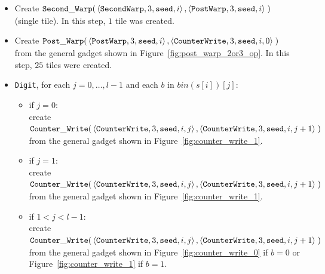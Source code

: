 \begin{itemize}
    \item Create
    $\begin{aligned}[t]
        {\tt Second\_Warp}(&\left\langle {\tt SecondWarp}, 3, {\tt seed}, i  \right\rangle,
                     \left\langle {\tt PostWarp},   3, {\tt seed}, i  \right\rangle \;)
    \end{aligned}$ (single tile).
    In this step, $1$ tile was created.

    \item Create
    $\begin{aligned}[t]
        {\tt Post\_Warp}(&\left\langle {\tt PostWarp}, 3, {\tt seed}, i    \right\rangle,
                   \left\langle {\tt CounterWrite},    3, {\tt seed}, i, 0 \right\rangle \;)
    \end{aligned}$\\from the general gadget shown in Figure~\ref{fig:post_warp_2or3_op}.
    In this step, $25$ tiles were created.

    \item {\tt Digit}, for each $j=0,\ldots,l-1$ and each $b$ in $bin(s[i])[j]$:
    \begin{itemize}
        \item if $j = 0$:\\ create
        $\begin{aligned}[t]
            {\tt Counter\_Write}(&\left\langle {\tt CounterWrite}, 3, {\tt seed}, i, j \right\rangle, \left\langle {\tt CounterWrite}, 3, {\tt seed}, i, j + 1 \right\rangle \;)
        \end{aligned}$\\from the general gadget shown in Figure~\ref{fig:counter_write_1}.

        \item if $j = 1$:\\ create
        $\begin{aligned}[t]
            {\tt Counter\_Write}(&\left\langle {\tt CounterWrite}, 3, {\tt seed}, i, j \right\rangle, \left\langle {\tt CounterWrite}, 3, {\tt seed}, i, j + 1 \right\rangle \;)
        \end{aligned}$\\from the general gadget shown in Figure~\ref{fig:counter_write_1}.

        \item if $1 < j < l-1$:\\ create
        $\begin{aligned}[t]
            {\tt Counter\_Write}(&\left\langle {\tt CounterWrite}, 3, {\tt seed}, i, j \right\rangle, \left\langle {\tt CounterWrite}, 3, {\tt seed}, i, j + 1 \right\rangle \;)
        \end{aligned}$\\from the general gadget shown in Figure~\ref{fig:counter_write_0} if $b = 0$ or Figure~\ref{fig:counter_write_1} if $b = 1$.


\end{itemize}
\end{itemize}
